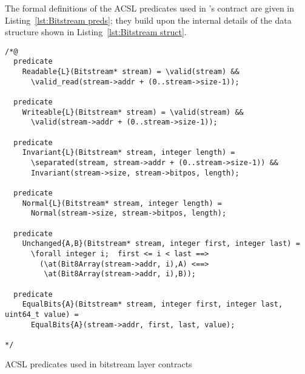 The formal definitions of the ACSL predicates used
in 's contract are given in
Listing~\ref{lst:Bitstream preds}; they build upon the internal
details of the  data structure shown in
Listing~\ref{lst:Bitstream struct}.



\begin{listing}[hbt]
\begin{minipage}{0.99\textwidth}
\begin{lstlisting}[style=acsl-block]
/*@
  predicate 
    Readable{L}(Bitstream* stream) = \valid(stream) &&
      \valid_read(stream->addr + (0..stream->size-1));

  predicate
    Writeable{L}(Bitstream* stream) = \valid(stream) &&
      \valid(stream->addr + (0..stream->size-1));

  predicate
    Invariant{L}(Bitstream* stream, integer length) =
      \separated(stream, stream->addr + (0..stream->size-1)) &&
      Invariant(stream->size, stream->bitpos, length);

  predicate
    Normal{L}(Bitstream* stream, integer length) =
      Normal(stream->size, stream->bitpos, length);

  predicate
    Unchanged{A,B}(Bitstream* stream, integer first, integer last) =
      \forall integer i;  first <= i < last ==>
        (\at(Bit8Array(stream->addr, i),A) <==>
         \at(Bit8Array(stream->addr, i),B));

  predicate
    EqualBits{A}(Bitstream* stream, integer first, integer last, uint64_t value) =
      EqualBits{A}(stream->addr, first, last, value);

*/
\end{lstlisting}
\end{minipage}
\caption{\label{lst:Bitstream preds}
	ACSL predicates used in bitstream layer contracts}
\end{listing}

\FloatBarrier

